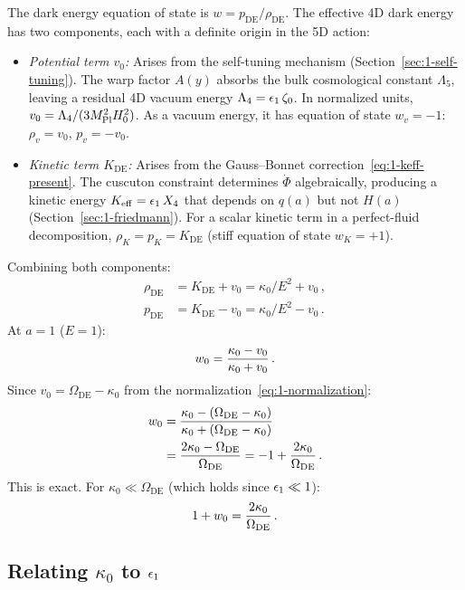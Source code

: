 The dark energy equation of state is $w = p_{\mathrm{DE}}/\rho_{\mathrm{DE}}$. The effective 4D dark energy has two components, each with a definite origin in the 5D action:
\begin{itemize}
  \item \emph{Potential term $v_0$:} Arises from the self-tuning mechanism (Section~\ref{sec:1-self-tuning}). The warp factor $A(y)$ absorbs the bulk cosmological constant $\Lambda_5$, leaving a residual 4D vacuum energy $\Lambda_4 = \epsilon_1\,\zeta_0$. In normalized units, $v_0 = \Lambda_4/(3M_{\mathrm{Pl}}^2 H_0^2)$. As a vacuum energy, it has equation of state $w_v = -1$: $\rho_v = v_0$, $p_v = -v_0$.
  \item \emph{Kinetic term $K_\mathrm{DE}$:} Arises from the Gauss--Bonnet correction~\eqref{eq:1-keff-present}. The cuscuton constraint determines $\dot\Phi$ algebraically, producing a kinetic energy $K_{\mathrm{eff}} = \epsilon_1\, X_4$ that depends on $q(a)$ but not $H(a)$ (Section~\ref{sec:1-friedmann}). For a scalar kinetic term in a perfect-fluid decomposition, $\rho_K = p_K = K_\mathrm{DE}$ (stiff equation of state $w_K = +1$).
\end{itemize}
Combining both components:
\begin{align}
\rho_{\mathrm{DE}} &= K_{\mathrm{DE}} + v_0 = \kappa_0/E^2 + v_0\,, \label{eq:1-rho-de-decomp}\\
p_{\mathrm{DE}} &= K_{\mathrm{DE}} - v_0 = \kappa_0/E^2 - v_0\,. \label{eq:1-p-de-decomp}
\end{align}
At $a = 1$ ($E = 1$):
\begin{equation}
\label{eq:1-w0-ratio}
w_0 = \frac{\kappa_0 - v_0}{\kappa_0 + v_0}\,.
\end{equation}
Since $v_0 = \Omega_{\mathrm{DE}} - \kappa_0$ from the normalization~\eqref{eq:1-normalization}:
\begin{align}
\label{eq:1-w0-exact}
w_0 &= \frac{\kappa_0 - (\Omega_{\mathrm{DE}} - \kappa_0)}{\kappa_0 + (\Omega_{\mathrm{DE}} - \kappa_0)} \notag\\
    &= \frac{2\kappa_0 - \Omega_{\mathrm{DE}}}{\Omega_{\mathrm{DE}}} = -1 + \frac{2\kappa_0}{\Omega_{\mathrm{DE}}}\,.
\end{align}
This is exact. For $\kappa_0 \ll \Omega_{\mathrm{DE}}$ (which holds since $\epsilon_1 \ll 1$):
\begin{equation}
\label{eq:1-1pw0}
1 + w_0 = \frac{2\kappa_0}{\Omega_{\mathrm{DE}}}\,.
\end{equation}

\subsection{Relating \texorpdfstring{$\kappa_0$}{kappa0} to \texorpdfstring{$\epsilon_1$}{epsilon1}}
\label{sec:1-kappa-eps}

